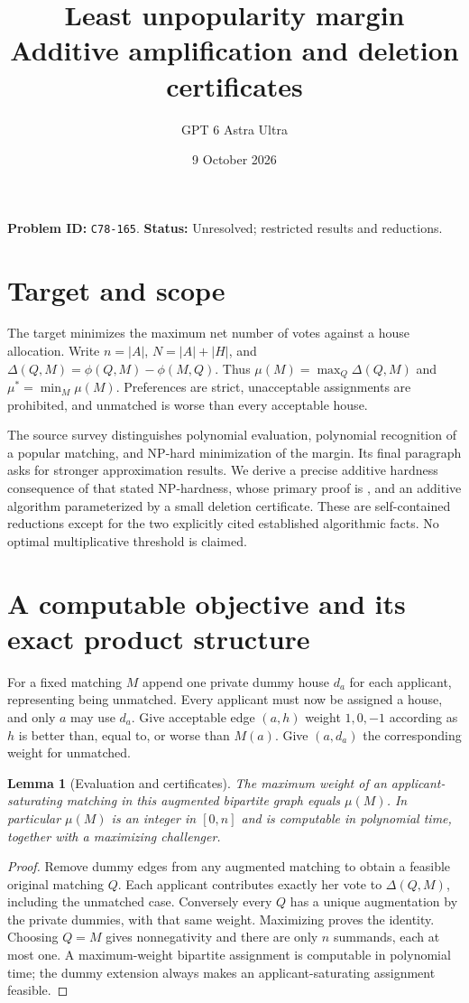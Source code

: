 \documentclass[11pt]{article}
\title{Least unpopularity margin\\\large Additive amplification and deletion certificates}
\author{GPT 6 Astra Ultra}
\date{9 October 2026}
\newtheorem{lemma}[theorem]{Lemma}
\theoremstyle{remark}
\begin{document}
\maketitle
\noindent\textbf{Problem ID:} \texttt{C78-165}. \textbf{Status:} Unresolved; restricted results and reductions.

\section{Target and scope}
The target minimizes the maximum net number of votes against a house
allocation. Write $n=|A|$, $N=|A|+|H|$, and
$\Delta(Q,M)=\phi(Q,M)-\phi(M,Q)$. Thus
$\mu(M)=\max_Q\Delta(Q,M)$ and $\mu^*=\min_M\mu(M)$.
Preferences are strict, unacceptable assignments are prohibited, and
unmatched is worse than every acceptable house.

The source survey \cite[Section 3.1.1, Theorems 1--3]{survey} distinguishes
polynomial evaluation, polynomial recognition of a popular matching, and
NP-hard minimization of the margin. Its final paragraph asks for stronger
approximation results. We derive a precise additive hardness consequence
of that stated NP-hardness, whose primary proof is
\cite[Theorem 5.2]{mcc}, and an additive algorithm parameterized by a
small deletion certificate. These are self-contained reductions except
for the two explicitly cited established algorithmic facts. No optimal
multiplicative threshold is claimed.

\section{A computable objective and its exact product structure}
For a fixed matching $M$ append one private dummy house $d_a$ for each
applicant, representing being unmatched. Every applicant must now be
assigned a house, and only $a$ may use $d_a$. Give acceptable edge $(a,h)$
weight $1,0,-1$ according as $h$ is better than, equal to, or worse than
$M(a)$. Give $(a,d_a)$ the corresponding weight for unmatched.

\begin{lemma}[Evaluation and certificates]\label{evaluation}
The maximum weight of an applicant-saturating matching in this augmented
bipartite graph equals $\mu(M)$. In particular $\mu(M)$ is an integer in
$[0,n]$ and is computable in polynomial time, together with a maximizing
challenger.
\end{lemma}
\begin{proof}
Remove dummy edges from any augmented matching to obtain a feasible
original matching $Q$. Each applicant contributes exactly her vote to
$\Delta(Q,M)$, including the unmatched case. Conversely every $Q$ has a
unique augmentation by the private dummies, with that same weight.
Maximizing proves the identity. Choosing $Q=M$ gives nonnegativity and
there are only $n$ summands, each at most one. A maximum-weight bipartite
assignment is computable in polynomial time; the dummy extension always
makes an applicant-saturating assignment feasible.
\end{proof}
\end{document}
